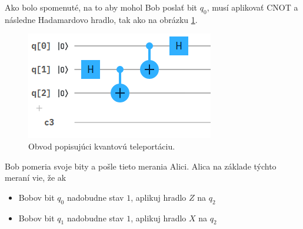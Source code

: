 Ako bolo spomenuté, na to aby mohol Bob poslať bit \(q_0\), musí aplikovať
CNOT a následne Hadamardovo hradlo, tak ako na obrázku \ref{tel_c2}.

\begin{figure} 
	\centering 
	\includegraphics[width=.5\textwidth]{figures/tel_c2.png} 
	\caption{Obvod popisujúci kvantovú teleportáciu.}
    \label{tel_c2}
\end{figure}

Bob pomeria svoje bity a pošle tieto merania Alici. Alica na základe týchto
meraní vie, že ak
\begin{itemize}
    \item[] Bobov bit \(q_0\) nadobudne stav \(1\), aplikuj hradlo \(Z\) na 
            \(q_2\)
    \item[] Bobov bit \(q_1\) nadobudne stav \(1\), aplikuj hradlo \(X\) na 
            \(q_2\)
\end{itemize}
